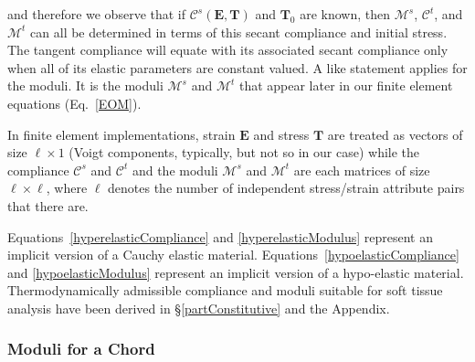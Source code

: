 and therefore we observe that if $\boldsymbol{\mathcal{C}}^s (\boldsymbol{E}, \boldsymbol{T})$ and $\boldsymbol{T}_0$ are known, then $\boldsymbol{\mathcal{M}}^s$, $\boldsymbol{\mathcal{C}}^t$, and $\boldsymbol{\mathcal{M}}^t$ can all be determined in terms of this secant compliance and initial stress.  The tangent compliance will equate with its associated secant compliance only when all of its elastic parameters are constant valued.  A like statement applies for the moduli.  It is the moduli $\boldsymbol{\mathcal{M}}^s$ and $\boldsymbol{\mathcal{M}}^t$ that appear later in our finite element equations (Eq.~\ref{EOM}).

In finite element implementations, strain $\boldsymbol{E}$ and stress $\boldsymbol{T}$ are treated as vectors of size $\ell \! \times \! 1$ (Voigt components, typically, but not so in our case) while the compliance $\boldsymbol{\mathcal{C}}^s$ and $\boldsymbol{\mathcal{C}}^t$ and the moduli $\boldsymbol{\mathcal{M}}^s$ and $\boldsymbol{\mathcal{M}}^t$ are each matrices of size $\ell \! \times \! \ell$, where $\ell$ denotes the number of independent stress\slash strain attribute pairs that there are.

Equations~\ref{hyperelasticCompliance} and \ref{hyperelasticModulus} represent an implicit version of a Cauchy elastic material. Equations~\ref{hypoelasticCompliance} and \ref{hypoelasticModulus} represent an implicit version of a hypo-elastic material.  Thermo\-dynamically admissible compliance and moduli suitable for soft tissue analysis have been derived in \S\ref{partConstitutive} and the Appendix.


\subsubsection{Moduli for a Chord}

